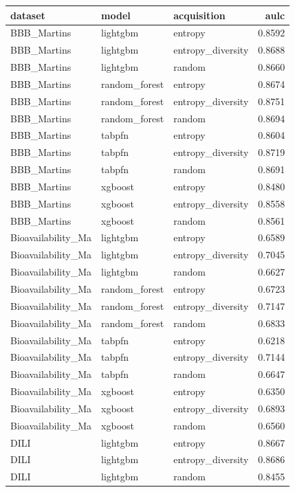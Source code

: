 \begin{tabular}{lllr}
\toprule
dataset & model & acquisition & aulc \\
\midrule
BBB_Martins & lightgbm & entropy & 0.8592 \\
BBB_Martins & lightgbm & entropy_diversity & 0.8688 \\
BBB_Martins & lightgbm & random & 0.8660 \\
BBB_Martins & random_forest & entropy & 0.8674 \\
BBB_Martins & random_forest & entropy_diversity & 0.8751 \\
BBB_Martins & random_forest & random & 0.8694 \\
BBB_Martins & tabpfn & entropy & 0.8604 \\
BBB_Martins & tabpfn & entropy_diversity & 0.8719 \\
BBB_Martins & tabpfn & random & 0.8691 \\
BBB_Martins & xgboost & entropy & 0.8480 \\
BBB_Martins & xgboost & entropy_diversity & 0.8558 \\
BBB_Martins & xgboost & random & 0.8561 \\
Bioavailability_Ma & lightgbm & entropy & 0.6589 \\
Bioavailability_Ma & lightgbm & entropy_diversity & 0.7045 \\
Bioavailability_Ma & lightgbm & random & 0.6627 \\
Bioavailability_Ma & random_forest & entropy & 0.6723 \\
Bioavailability_Ma & random_forest & entropy_diversity & 0.7147 \\
Bioavailability_Ma & random_forest & random & 0.6833 \\
Bioavailability_Ma & tabpfn & entropy & 0.6218 \\
Bioavailability_Ma & tabpfn & entropy_diversity & 0.7144 \\
Bioavailability_Ma & tabpfn & random & 0.6647 \\
Bioavailability_Ma & xgboost & entropy & 0.6350 \\
Bioavailability_Ma & xgboost & entropy_diversity & 0.6893 \\
Bioavailability_Ma & xgboost & random & 0.6560 \\
DILI & lightgbm & entropy & 0.8667 \\
DILI & lightgbm & entropy_diversity & 0.8686 \\
DILI & lightgbm & random & 0.8455 \\

\end{tabular}
